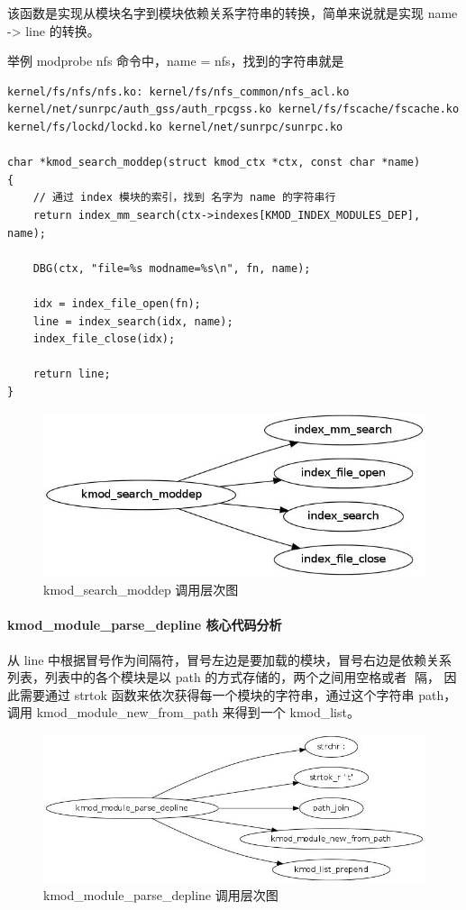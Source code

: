 \documentclass[11pt,a4paper]{article}
\makeatletter
\def\maxwidth{\ifdim\Gin@nat@width>\linewidth\linewidth
\else\Gin@nat@width\fi}
\let\Oldincludegraphics\includegraphics
\renewcommand{\includegraphics}[1]{\Oldincludegraphics[width=\maxwidth]{#1}}
\makeatother
\begin{document}
该函数是实现从模块名字到模块依赖关系字符串的转换，简单来说就是实现 name
-\textgreater{} line 的转换。

举例 modprobe nfs 命令中，name = nfs，找到的字符串就是

{\begin{shaded}\begin{verbatim}
kernel/fs/nfs/nfs.ko: kernel/fs/nfs_common/nfs_acl.ko kernel/net/sunrpc/auth_gss/auth_rpcgss.ko kernel/fs/fscache/fscache.ko kernel/fs/lockd/lockd.ko kernel/net/sunrpc/sunrpc.ko

char *kmod_search_moddep(struct kmod_ctx *ctx, const char *name)
{
    // 通过 index 模块的索引，找到 名字为 name 的字符串行
    return index_mm_search(ctx->indexes[KMOD_INDEX_MODULES_DEP], name);

    DBG(ctx, "file=%s modname=%s\n", fn, name);

    idx = index_file_open(fn);
    line = index_search(idx, name);
    index_file_close(idx);

    return line;
}
\end{verbatim}\end{shaded}}
\begin{figure}[htbp]
\centering
\includegraphics{./figures/kmod_search_moddep.jpg}
\caption{kmod\_search\_moddep 调用层次图}
\end{figure}

\paragraph{kmod\_module\_parse\_depline 核心代码分析}

从 line
中根据冒号作为间隔符，冒号左边是要加载的模块，冒号右边是依赖关系列表，列表中的各个模块是以
path 的方式存储的，两个之间用空格或者 \t 间隔， 因此需要通过 strtok
函数来依次获得每一个模块的字符串，通过这个字符串 path，调用
kmod\_module\_new\_from\_path 来得到一个 kmod\_list。

\begin{figure}[htbp]
\centering
\includegraphics{./figures/kmod_module_parse_depline.jpg}
\caption{kmod\_module\_parse\_depline 调用层次图}
\end{figure}
\end{document}
